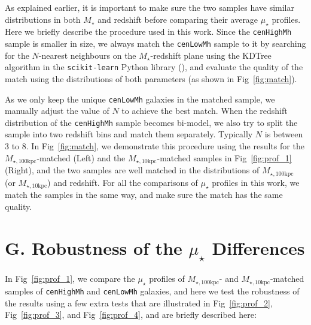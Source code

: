 \documentclass{emulateapj}
\def\rbcg{\texttt{cenHighMh}}
\def\nbcg{\texttt{cenLowMh}}
\def\mstar{{$M_{\star}$}}
\def\minn{{$M_{\star,10\mathrm{kpc}}$}}
\def\mtot{{$M_{\star,100\mathrm{kpc}}$}}
\def\mden{{$\mu_{\star}$}}
\begin{document}
\begin{CJK*}{UTF8}{gbsn}
    As explained earlier, it is important to make sure the two samples have similar 
    distributions in both \mstar{} and redshift before comparing their average \mden{} 
    profiles.  
    Here we briefly describe the procedure used in this work. 
    Since the \rbcg{} sample is smaller in size, we always match the \nbcg{} sample to 
    it by searching for the $N$-nearest neighbours on the $M_{\star}$-redshift plane 
    using the KDTree algorithm in the \texttt{scikit-learn} Python library 
    (\citealt{scikit-learn}), and evaluate the quality of the match using the 
    distributions of both parameters (as shown in Fig~\ref{fig:match}). 
 
    As we only keep the unique \nbcg{} galaxies in the matched sample, we manually 
    adjust the value of $N$ to achieve the best match. 
    When the redshift distribution of the \rbcg{} sample becomes bi-model, we also try 
    to split the sample into two redshift bins and match them separately. 
    Typically $N$ is between 3 to 8.
    In Fig~\ref{fig:match}, we demonstrate this procedure using the results for 
    the \mtot{}-matched (Left) and the \minn{}-matched samples in Fig~\ref{fig:prof_1}
    (Right), and the two samples are well matched in the distributions of \mtot{}
    (or \minn{}) and redshift.  
    For all the comparisons of \mden{} profiles in this work, we match the samples 
    in the same way, and make sure the match has the same quality. 
    
\section{G. Robustness of the \mden{} Differences} 
	\label{app:robust}
    
    In Fig~\ref{fig:prof_1}, we compare the \mden{} profiles of \mtot{}- and 
    \minn{}-matched samples of \rbcg{} and \nbcg{} galaxies, and here we test the 
    robustness of the results using a few extra tests that are illustrated in
    Fig~\ref{fig:prof_2}, Fig~\ref{fig:prof_3}, and Fig~\ref{fig:prof_4}, and 
    are briefly described here:   
    
    \begin{enumerate}
        

\end{enumerate}
\end{CJK*}
\end{document}
